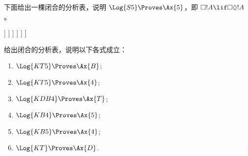 \documentclass[../../../include/open-logic-section]{subfiles}
\begin{document}
\begin{ex}
  下面给出一棵闭合的分析表，说明 $\Log{S5} \Proves \Ax{5}$，即
  $\Box!A \lif \Box\Diamond!A$。
  \begin{oltableau}
    [\pFmla{\False}{\Box\formula{A} \lif \Box\Diamond \formula{A}}{1},
      just = \TAss
      [\pFmla{\True}{\Box \formula{A}}{1}, just = {\TRule{\False}{\lif}[1]}
        [\pFmla{\False}{\Box\Diamond \formula{A}}{1},
          just = {\TRule{\False}{\lif}[1]}
          [\pFmla{\False}{\Diamond \formula{A}}{1.1},
            just = {\TRule{\False}{\Box}[3]}
            [\pFmla{\False}{\Diamond \formula{A}}{1},
              just = {4r$\Diamond$ 4}
              [\pFmla{\False}{\formula{A}}{1.1},
                just = {\TRule{\False}{\Diamond}[5]}
                [\pFmla{\True}{\formula{A}}{1.1},
                  just = {\TRule{\True}{\Box}[2]}, close]
              ]
            ]
          ]
        ]
      ]
    ]
  \end{oltableau}
\end{ex}

\begin{prob}
给出闭合的分析表，说明以下各式成立：
  \begin{enumerate}
  \item $\Log{KT5} \Proves \Ax{B}$;
  \item $\Log{KT5} \Proves \Ax{4}$;
  \item $\Log{KDB4} \Proves \Ax{T}$;
  \item $\Log{KB4} \Proves \Ax{5}$;
  \item $\Log{KB5} \Proves \Ax{4}$;
  \item $\Log{KT} \Proves \Ax{D}$.
  \end{enumerate}
\end{prob}
\end{document}
